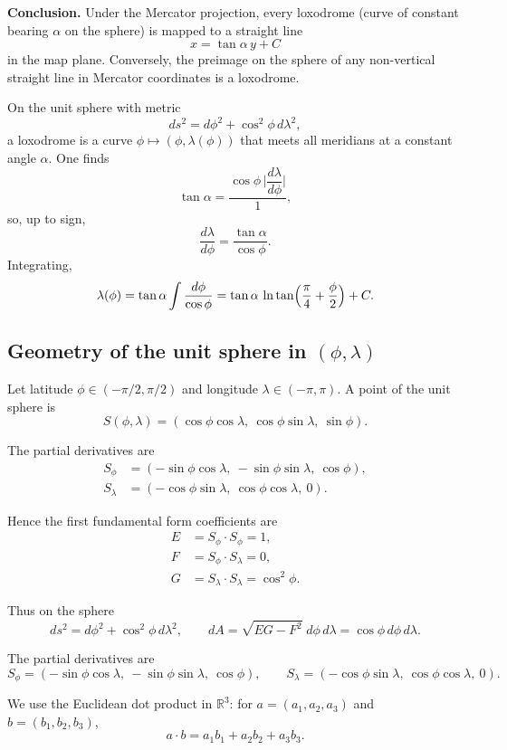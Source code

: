 \documentclass[12pt,a4paper]{article}
\theoremstyle{plain}
\theoremstyle{definition}      %
\begin{document}
\medskip
\noindent
\textbf{Conclusion.}
Under the Mercator projection, every loxodrome (curve of constant
bearing $\alpha$ on the sphere) is mapped to a straight line
\[
x = \tan\alpha \,y + C
\]
in the map plane. Conversely, the preimage on the sphere of any non-vertical
straight line in Mercator coordinates is a loxodrome.


On the unit sphere with metric
\[
ds^2 = d\phi^2 + \cos^2\phi\,d\lambda^2,
\]
a loxodrome is a curve $\phi\mapsto(\phi,\lambda(\phi))$ that meets all
meridians at a constant angle $\alpha$. One finds
\[
\tan\alpha = \frac{\cos\phi\,\bigl|\dfrac{d\lambda}{d\phi}\bigr|}{1},
\]
so, up to sign,
\[
\boxed{\frac{d\lambda}{d\phi} = \frac{\tan\alpha}{\cos\phi}}.
\]
Integrating,
\[
\lambda(\phi)
= \tan\alpha \int \frac{d\phi}{\cos\phi}
= \tan\alpha \,\ln\tan\Bigl(\frac{\pi}{4}+\frac{\phi}{2}\Bigr) + C.
\]


\subsection*{Geometry of the unit sphere in $(\phi,\lambda)$}

Let latitude $\phi\in(-\pi/2,\pi/2)$ and longitude $\lambda\in(-\pi,\pi)$.
A point of the unit sphere is
\[
S(\phi,\lambda)
= (\cos\phi\cos\lambda,\ \cos\phi\sin\lambda,\ \sin\phi).
\]

The partial derivatives are
\[
\begin{aligned}
	S_\phi &= (-\sin\phi\cos\lambda,\ -\sin\phi\sin\lambda,\ \cos\phi),\\[1mm]
	S_\lambda &= (-\cos\phi\sin\lambda,\ \cos\phi\cos\lambda,\ 0).
\end{aligned}
\]

Hence the first fundamental form coefficients are
\[
\begin{aligned}
	E &= S_\phi\cdot S_\phi = 1,\\
	F &= S_\phi\cdot S_\lambda = 0,\\
	G &= S_\lambda\cdot S_\lambda = \cos^{2}\phi.
\end{aligned}
\]

Thus on the sphere
\[
ds^{2} = d\phi^{2} + \cos^{2}\phi\,d\lambda^{2},
\qquad
dA = \sqrt{EG-F^{2}}\;d\phi\,d\lambda
= \cos\phi\,d\phi\,d\lambda.
\]


The partial derivatives are
\[
S_\phi = (-\sin\phi\cos\lambda,\ -\sin\phi\sin\lambda,\ \cos\phi),\qquad
S_\lambda = (-\cos\phi\sin\lambda,\ \cos\phi\cos\lambda,\ 0).
\]

We use the Euclidean dot product in $\mathbb{R}^3$:
for $a=(a_1,a_2,a_3)$ and $b=(b_1,b_2,b_3)$,
\[
a\cdot b = a_1b_1 + a_2b_2 + a_3b_3.
\]
\end{document}

